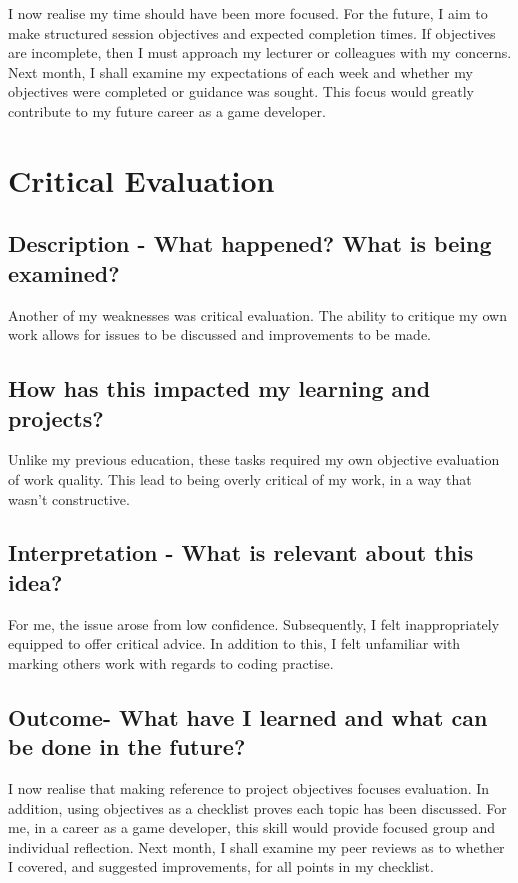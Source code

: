 \documentclass{scrartcl}
\begin{document}
I now realise my time should have been more focused. For the future, I aim to make structured session objectives and expected completion times. If objectives are incomplete, then I must approach my lecturer or colleagues with my concerns. Next month, I shall examine my expectations of each week and whether my objectives were completed or guidance was sought. This focus would greatly contribute to my future career as a game developer.

\section{Critical Evaluation}

\subsection{Description - What happened? What is being examined?}

Another of my weaknesses was critical evaluation. The ability to critique my own work allows for issues to be discussed and improvements to be made.

\subsection{How has this impacted my learning and projects?}

Unlike my previous education, these tasks required my own objective evaluation of work quality. This lead to being overly critical of my work, in a way that wasn't constructive.

\subsection{Interpretation - What is relevant about this idea?}

For me, the issue arose from low confidence. Subsequently, I felt inappropriately equipped to offer critical advice. In addition to this, I felt unfamiliar with marking others work with regards to coding practise.

\subsection{Outcome- What have I learned and what can be done in the future?}

I now realise that making reference to project objectives focuses evaluation. In addition, using objectives as a checklist proves each topic has been discussed. For me, in a career as a game developer, this skill would provide focused group and individual reflection. Next month, I shall examine my peer reviews as to whether I covered, and suggested improvements, for all points in my checklist.
\end{document}
